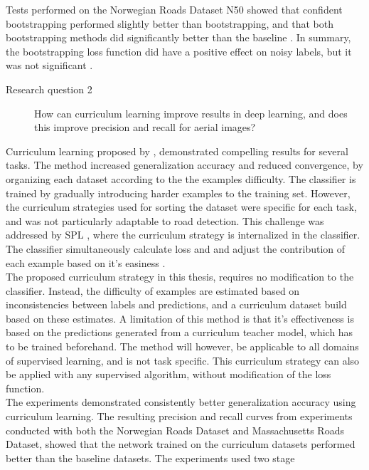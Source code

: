 Tests performed on the Norwegian Roads Dataset N50 showed that confident bootstrapping performed slightly better than bootstrapping, and that both bootstrapping methods did significantly better than the baseline . In summary, the bootstrapping loss function did have a positive effect on noisy labels, but it was not significant . 


\begin{description}
\item[Research question 2]  How can curriculum learning improve results in deep learning, and does this improve precision and recall for aerial images?
\end{description}

Curriculum learning proposed by \cite{Bengio_curriculumlearning}, demonstrated compelling results for several tasks. The method increased generalization accuracy and reduced convergence, by organizing each dataset according to the the examples difficulty. The classifier is trained by gradually introducing harder examples to the training set. However, the curriculum strategies used for sorting the dataset were specific for each task, and was not particularly adaptable to road detection. This challenge was addressed by \ac{SPL} \citep{Kumar_self_paced_learning}, where the curriculum strategy is internalized in the classifier. The classifier simultaneously calculate loss and and adjust the contribution of each example based on it's easiness  .\\

The proposed curriculum strategy in this thesis, requires no modification to the classifier. Instead, the difficulty of examples are estimated based on inconsistencies between labels and predictions, and a curriculum dataset build based on these estimates. A limitation of this method is that it's effectiveness is based on the predictions generated from a curriculum teacher model, which has to be trained beforehand. The method will however, be applicable to all domains of supervised learning, and  is not task specific. This curriculum strategy can also be applied with any supervised algorithm, without modification of the loss function. \\

The experiments demonstrated consistently better generalization accuracy using curriculum learning. The resulting precision and recall curves from experiments conducted with both the Norwegian Roads Dataset and Massachusetts Roads Dataset, showed that the network trained on the curriculum datasets performed better than the baseline datasets. The experiments used two stage \\


